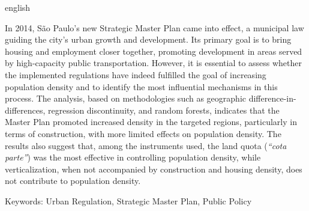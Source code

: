 \documentclass[
  a4paper, 
  12pt, 
  openany, 
  oneside, 
  brazil,
]{abntex2}
\begin{document}
\begin{resumo}[Abstract]
 \begin{otherlanguage*}{english}

  In 2014, São Paulo's new Strategic Master Plan came into effect, a municipal law guiding the city's urban growth and development. Its primary goal is to bring housing and employment closer together, promoting development in areas served by high-capacity public transportation. However, it is essential to assess whether the implemented regulations have indeed fulfilled the goal of increasing population density and to identify the most influential mechanisms in this process. The analysis, based on methodologies such as geographic difference-in-differences, regression discontinuity, and random forests, indicates that the Master Plan promoted increased density in the targeted regions, particularly in terms of construction, with more limited effects on population density. The results also suggest that, among the instruments used, the land quota (\textit{``cota parte''}) was the most effective in controlling population density, while verticalization, when not accompanied by construction and housing density, does not contribute to population density.

  Keywords: Urban Regulation, Strategic Master Plan, Public Policy

 \end{otherlanguage*}
\end{resumo}


\tableofcontents*
\cleardoublepage


\textual
\pagestyle{tccinsper} %



\postextual
 





% 
% 
%



% 



\end{document}
